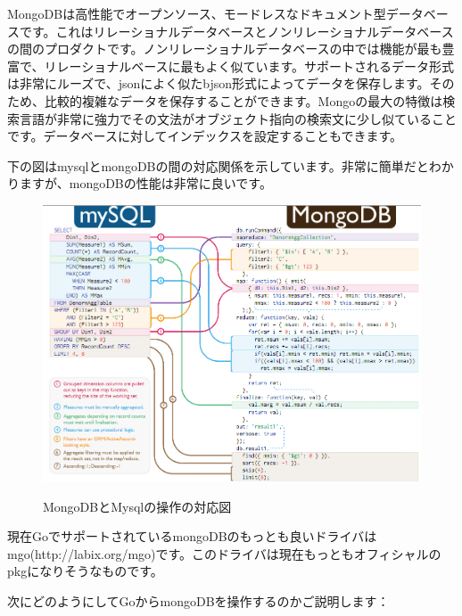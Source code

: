 MongoDBは高性能でオープンソース、モードレスなドキュメント型データベースです。これはリレーショナルデータベースとノンリレーショナルデータベースの間のプロダクトです。ノンリレーショナルデータベースの中では機能が最も豊富で、リレーショナルベースに最もよく似ています。サポートされるデータ形式は非常にルーズで、jsonによく似たbjson形式によってデータを保存します。そのため、比較的複雑なデータを保存することができます。Mongoの最大の特徴は検索言語が非常に強力でその文法がオブジェクト指向の検索文に少し似ていることです。データベースに対してインデックスを設定することもできます。

下の図はmysqlとmongoDBの間の対応関係を示しています。非常に簡単だとわかりますが、mongoDBの性能は非常に良いです。

\begin{figure}[H]
  \includegraphics[width=14cm]{5.6.mongodb.png}
   \label{図5.1}
   \caption{MongoDBとMysqlの操作の対応図}
\end{figure}

現在GoでサポートされているmongoDBのもっとも良いドライバはmgo(http://labix.org/mgo)です。このドライバは現在もっともオフィシャルのpkgになりそうなものです。

次にどのようにしてGoからmongoDBを操作するのかご説明します：

